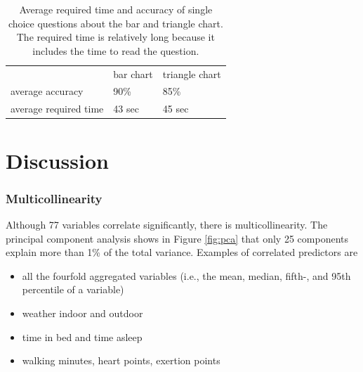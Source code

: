 \documentclass[conference]{IEEEtran}
\begin{document}
\begin{table}[]
\caption{Average required time and accuracy of single choice questions about the bar and triangle chart. The required time is relatively long because it includes the time to read the question.}
\begin{tabular}{lll}
\textbf{}             & bar chart & triangle chart \\
average accuracy      & 90\%       & 85\%           \\
average required time & 43 sec    & 45 sec        
\end{tabular}
    \label{tab:study}
\end{table}



\section{Discussion}

\subsubsection{Multicollinearity}
Although 77 variables correlate significantly, there is multicollinearity. The principal component analysis shows in Figure \ref{fig:pca} that only 25 components explain more than 1\% of the total variance. Examples of correlated predictors are
\begin{itemize}
    \item all the fourfold aggregated variables (i.e., the mean, median, fifth-, and 95th percentile of a variable)
    \item weather indoor and outdoor
    \item time in bed and time asleep
    \item walking minutes, heart points, exertion points
\end{itemize}
\end{document}
